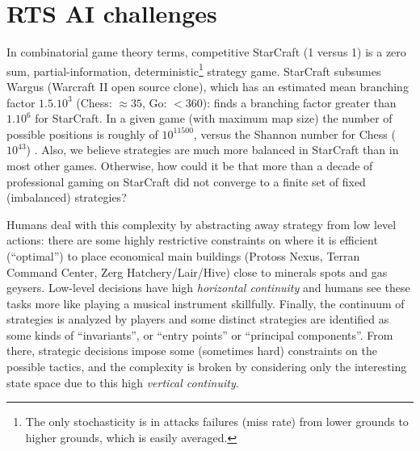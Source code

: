 \section{RTS AI challenges}
\label{sec:rtsaichallenges}
In combinatorial game theory terms, competitive StarCraft (1 versus 1) is a zero sum, partial-information, deterministic\footnote{The only stochasticity is in attacks failures (miss rate) from lower grounds to higher grounds, which is easily averaged.} strategy game. 
StarCraft subsumes Wargus (Warcraft II open source clone), which has an estimated mean branching factor $1.5.10^3$ \citep{LTW} (Chess: $\approx 35$, Go: $<360$): \cite{bgweberPhD} finds a branching factor greater than $1.10^6$ for StarCraft. In a given game (with maximum map size) the number of possible positions is roughly of $10^{11500}$, versus the Shannon number for Chess ($10^{43}$) \citep{Shannon_1950}. Also, we believe strategies are much more balanced in StarCraft than in most other games. Otherwise, how could it be that more than a decade of professional gaming on StarCraft did not converge to a finite set of fixed (imbalanced) strategies?

Humans deal with this complexity by abstracting away strategy from low level actions: there are some highly restrictive constraints on where it is efficient (``optimal'') to place economical main buildings (Protoss Nexus, Terran Command Center, Zerg Hatchery/Lair/Hive) close to minerals spots and gas geysers. Low-level  decisions have high \textit{horizontal continuity} and humans see these tasks more like playing a musical instrument skillfully. Finally, the continuum of strategies is analyzed by players and some distinct strategies are identified as some kinds of ``invariants'', or ``entry points'' or ``principal components''. From there, strategic decisions impose some (sometimes hard) constraints on the possible tactics, and the complexity is broken by considering only the interesting state space due to this high \textit{vertical continuity}.

